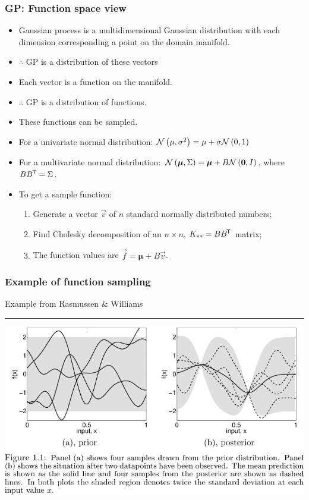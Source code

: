 \begin{frame} \frametitle{GP: Function space view}
\begin{itemize}
  \item Gaussian process is a multidimensional Gaussian distribution with each
    dimension corresponding a point on the domain manifold.
  \item $\therefore$ GP is a distribution of these vectors
  \item Each vector is a function on the manifold.
  \item $\therefore$ GP is a distribution of functions.
  \vspace{5mm}
  \item These functions can be sampled.
  \item For a univariate normal distribution:
    $\mathcal{N}\left(\mu,\sigma^2\right) = \mu + \sigma\mathcal{N}\left(0,1\right)$
  \item For a multivariate normal distribution:
    $\mathcal{N}\left(\bm{\mu},\Sigma\right) = \bm{\mu} + B\mathcal{N}\left(\mathbf{0},I\right)$,
    where $BB^{\mkern-1.5mu\mathsf{T}}=\Sigma$.
  \item To get a sample function:
  \begin{enumerate}
    \item Generate a vector $\vec{v}$ of $n$ standard normally distributed numbers;
    \item Find Cholesky decomposition of an $n\times n$, $K_{**} = BB^{\mkern-1.5mu\mathsf{T}}$ matrix;
    \item The function values are $\vec{f} = \bm{\mu} + B\vec{v}$.
  \end{enumerate}
\end{itemize}
\end{frame}

\begin{frame} \frametitle{Example of function sampling}
Example from Rasmussen \& Williams \\
{\color{white}\rule{2mm}{5mm}}
\includegraphics[width=\textwidth]{samples.pdf}
\end{frame}


